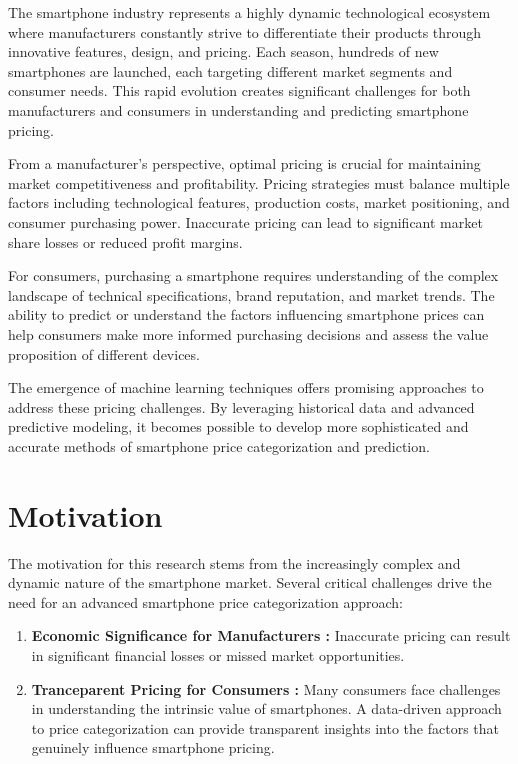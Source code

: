 \documentclass[12pt]{report}
\begin{document}
The smartphone industry represents a highly dynamic technological ecosystem where manufacturers constantly strive to differentiate their products through innovative features, design, and pricing. Each season, hundreds of new smartphones are launched, each targeting different market segments and consumer needs. This rapid evolution creates significant challenges for both manufacturers and consumers in understanding and predicting smartphone pricing.

From a manufacturer's perspective, optimal pricing is crucial for maintaining market competitiveness and profitability. Pricing strategies must balance multiple factors including technological features, production costs, market positioning, and consumer purchasing power. Inaccurate pricing can lead to significant market share losses or reduced profit margins.

For consumers, purchasing a smartphone requires understanding of the complex landscape of technical specifications, brand reputation, and market trends. The ability to predict or understand the factors influencing smartphone prices can help consumers make more informed purchasing decisions and assess the value proposition of different devices.

The emergence of machine learning techniques offers promising approaches to address these pricing challenges. By leveraging historical data and advanced predictive modeling, it becomes possible to develop more sophisticated and accurate methods of smartphone price categorization and prediction.
\section{Motivation}
The motivation for this research stems from the increasingly complex and dynamic nature of the smartphone market. Several critical challenges drive the need for an advanced smartphone price categorization approach:
\vspace{-1.25em}
\begin{enumerate}
	\setlength\itemsep{-1.05em}
	\item{\textbf{Economic Significance for Manufacturers :}} Inaccurate pricing can result in significant financial losses or missed market opportunities.
	\item{\textbf{Tranceparent Pricing for Consumers :}} Many consumers face challenges in understanding the intrinsic value of smartphones. A data-driven approach to price categorization can provide transparent insights into the factors that genuinely influence smartphone pricing.
\end{enumerate}
\end{document}
